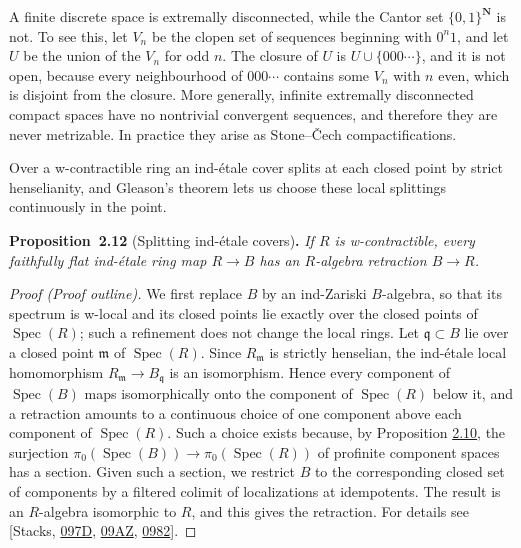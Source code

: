 \documentclass[11pt]{article}
\newenvironment{bpstatement}[2]{\par\addvspace{0.6\baselineskip}\noindent\textbf{#1}#2\textbf{.}\enspace\ignorespaces}
  {\par\addvspace{0.4\baselineskip}}
\newenvironment{bpstatementit}[2]{\begin{bpstatement}{#1}{#2}\itshape\ignorespaces}{\end{bpstatement}}
\begin{document}
\label{bp33}%
A finite discrete space is extremally disconnected, while the Cantor set \(\{0,1\}^{\mathbf N}\) is not. To see this, let \(V_n\) be the clopen set of sequences beginning with \(0^n1\), and let \(U\) be the union of the \(V_n\) for odd \(n\). The closure of \(U\) is \(U\cup\{000\cdots\}\), and it is not open, because every neighbourhood of \(000\cdots\) contains some \(V_n\) with \(n\) even, which is disjoint from the closure. More generally, infinite extremally disconnected compact spaces have no nontrivial convergent sequences, and therefore they are never metrizable. In practice they arise as Stone–Čech compactifications.

Over a w-contractible ring an ind-étale cover splits at each closed point by strict henselianity, and Gleason's theorem lets us choose these local splittings continuously in the point.

\label{bp34}%
\begin{bpstatementit}{Proposition~2.12}{ (Splitting ind-étale covers)}
If \(R\) is w-contractible, every faithfully flat ind-étale ring map \(R\to B\) has an \(R\)-algebra retraction \(B\to R\).
\end{bpstatementit}

\begin{proof}[{Proof (Proof outline)}]\label{bp35}%
We first replace \(B\) by an ind-Zariski \(B\)-algebra, so that its spectrum is w-local and its closed points lie exactly over the closed points of \(\operatorname{Spec}(R)\); such a refinement does not change the local rings. Let \(\mathfrak q\subset B\) lie over a closed point \(\mathfrak m\) of \(\operatorname{Spec}(R)\). Since \(R_{\mathfrak m}\) is strictly henselian, the ind-étale local homomorphism \(R_{\mathfrak m}\to B_{\mathfrak q}\) is an isomorphism. Hence every component of \(\operatorname{Spec}(B)\) maps isomorphically onto the component of \(\operatorname{Spec}(R)\) below it, and a retraction amounts to a continuous choice of one component above each component of \(\operatorname{Spec}(R)\). Such a choice exists because, by Proposition \hyperref[bp28]{2.10}, the surjection \(\pi_0(\operatorname{Spec}(B))\to\pi_0(\operatorname{Spec}(R))\) of profinite component spaces has a section. Given such a section, we restrict \(B\) to the corresponding closed set of components by a filtered colimit of localizations at idempotents. The result is an \(R\)-algebra isomorphic to \(R\), and this gives the retraction. For details see [Stacks, \href{https://stacks.math.columbia.edu/tag/097D}{097D}, \href{https://stacks.math.columbia.edu/tag/09AZ}{09AZ}, \href{https://stacks.math.columbia.edu/tag/0982}{0982}].
\end{proof}
\end{document}

